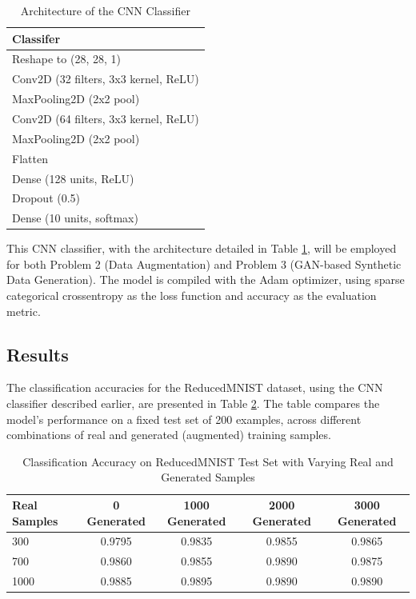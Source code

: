 \documentclass[12pt]{article}
\begin{document}
\begin{table}[h]
    \centering
    \caption{Architecture of the CNN Classifier}
    \label{tab:classifier_architecture}
    \begin{tabular}{l}
        \hline
        \textbf{Classifer} \\
        \hline
        Reshape to (28, 28, 1) \\
        \hline
        Conv2D (32 filters, 3x3 kernel, ReLU) \\
        \hline
        MaxPooling2D (2x2 pool) \\
        \hline
        Conv2D (64 filters, 3x3 kernel, ReLU) \\
        \hline
        MaxPooling2D (2x2 pool) \\
        \hline
        Flatten \\
        \hline
        Dense (128 units, ReLU) \\
        \hline
        Dropout (0.5) \\
        \hline
        Dense (10 units, softmax) \\
        \hline
    \end{tabular}
\end{table}
This CNN classifier, with the architecture detailed in Table \ref{tab:classifier_architecture}, will be employed for both Problem 2 (Data Augmentation) and Problem 3 (GAN-based Synthetic Data Generation). The model is compiled with the Adam optimizer, using sparse categorical crossentropy as the loss function and accuracy as the evaluation metric.
\subsection{Results}

The classification accuracies for the ReducedMNIST dataset, using the CNN classifier described earlier, are presented in Table \ref{tab:augmentation_results}. The table compares the model's performance on a fixed test set of 200 examples, across different combinations of real and generated (augmented) training samples.

\begin{table}[h]
    \centering
    \caption{Classification Accuracy on ReducedMNIST Test Set with Varying Real and Generated Samples}
    \label{tab:augmentation_results}
    \begin{tabular}{|l|c|c|c|c|}
        \hline
        \textbf{Real Samples} & \textbf{0 Generated} & \textbf{1000 Generated} & \textbf{2000 Generated} & \textbf{3000 Generated} \\
        \hline
        300 & 0.9795 & 0.9835 & 0.9855 & 0.9865 \\
        \hline
        700 & 0.9860 & 0.9855 & 0.9890 & 0.9875 \\
        \hline
        1000 & 0.9885 & 0.9895 & 0.9890 & 0.9890 \\
        \hline
    \end{tabular}
\end{table}
\end{document}
